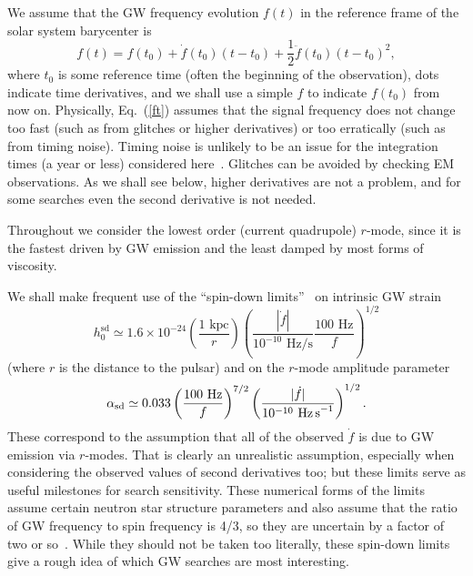\documentclass{ttuthes2007}
\begin{document}
We assume that the \ac{GW} frequency evolution $f(t)$ in the reference frame
of the solar system barycenter is
\begin{equation}
\label{ft}
f(t) = f\left( t_0 \right) + \dot f\left( t_0 \right) \left( t-t_0 \right) +
\frac{1}{2} \ddot f\left( t_0 \right) \left( t-t_0 \right)^2,
\end{equation}
where $t_0$ is some reference time (often the beginning of the observation),
dots indicate time derivatives, and we shall use a simple $f$ to indicate
$f(t_0)$ from now on.
Physically, Eq.~(\ref{ft}) assumes that the signal frequency does not change
too fast (such as from glitches or higher derivatives) or too erratically
(such as from timing noise).
Timing noise is unlikely to be an issue for the integration times (a year or
less) considered here~\cite{Ashton:2014qya}.
Glitches can be avoided by checking \ac{EM} observations.
As we shall see below, higher derivatives are not a problem, and for some
searches even the second derivative is not needed.

Throughout we consider the lowest order (current quadrupole) $r$-mode, since
it is the fastest driven by \ac{GW} emission and the least damped by most
forms of viscosity.

We shall make frequent use of the ``spin-down limits''~\cite{Owen_2010} on
intrinsic \ac{GW} strain~\cite{Jaranowski:1998qm}
\begin{equation}
h_0^\mathrm{sd} \simeq 1.6\times10^{-24} \left( \frac{\mbox{1 kpc}}{r} \right)
\left( \frac{\left|\dot f\right|} {10^{-10}\mbox{ Hz/s}} \frac{\mbox{100 Hz}}
{f} \right)^{1/2}
\label{h0sd}
\end{equation}
(where $r$ is the distance to the pulsar) and on the $r$-mode amplitude
parameter~\cite{LMoO:1998prl}
\begin{equation}
\alpha_\mathrm{sd} \simeq 0.033 \left( \frac{\mbox{100 Hz}} {f} \right)^{7/2}
\left( \frac{|\dot{f}|} {10^{-10}\mbox{ Hz\,s}^{-1}} \right)^{1/2}.
\end{equation}
These correspond to the assumption that all of the observed $\dot f$ is due to
\ac{GW} emission via $r$-modes.
That is clearly an unrealistic assumption, especially when considering the
observed values of second derivatives too; but these limits serve as useful
milestones for search sensitivity.
These numerical forms of the limits assume certain neutron star structure
parameters and also assume that the ratio of \ac{GW} frequency to spin
frequency is 4/3, so they are uncertain by a factor of two or
so~\cite{Owen_2010}.
While they should not be taken too literally, these spin-down limits give a
rough idea of which \ac{GW} searches are most interesting.
\end{document}
